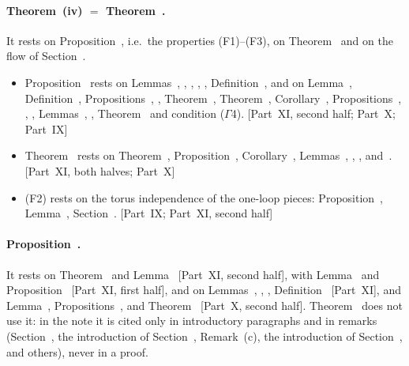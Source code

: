 \paragraph{Theorem~(iv) $=$ Theorem~.} It rests on Proposition~, i.e.\ the properties (F1)--(F3), on Theorem~ and on the flow of Section~.
\begin{itemize}
\item Proposition~ rests on Lemmas~, , , , , Definition~, and on Lemma~, Definition~, Propositions~, , Theorem~, Theorem~, Corollary~, Propositions~, , , Lemmas~, , Theorem~ and condition ($\Gamma$4). [Part~XI, second half; Part~X; Part~IX]
\item Theorem~ rests on Theorem~, Proposition~, Corollary~, Lemmas~, , ,  and~. [Part~XI, both halves; Part~X]
\item (F2) rests on the torus independence of the one-loop pieces: Proposition~, Lemma~, Section~. [Part~IX; Part~XI, second half]
\end{itemize}

\paragraph{Proposition~.} It rests on Theorem~ and Lemma~ [Part~XI, second half], with Lemma~ and Proposition~ [Part~XI, first half], and on Lemmas~, , , Definition~ [Part~XI], and Lemma~, Propositions~,  and Theorem~ [Part~X, second half]. Theorem~ does not use it: in the note it is cited only in introductory paragraphs and in remarks (Section~, the introduction of Section~, Remark~(c), the introduction of Section~, and others), never in a proof.
